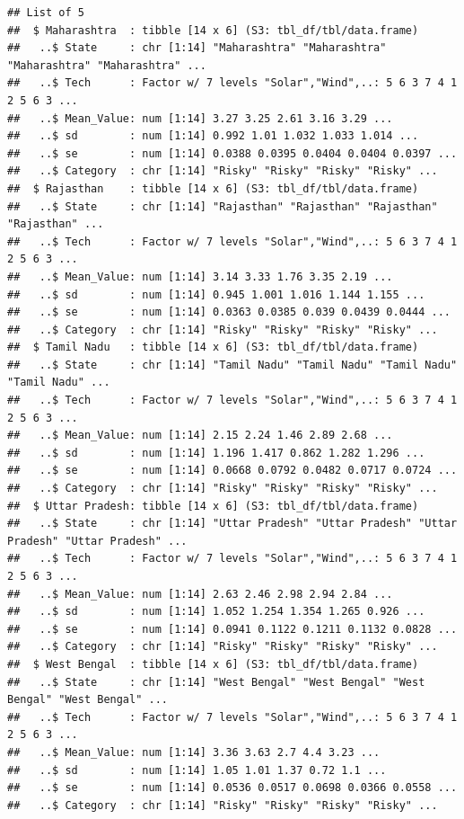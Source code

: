\documentclass[
]{article}
\begin{document}
\begin{verbatim}
## List of 5
##  $ Maharashtra  : tibble [14 x 6] (S3: tbl_df/tbl/data.frame)
##   ..$ State     : chr [1:14] "Maharashtra" "Maharashtra" "Maharashtra" "Maharashtra" ...
##   ..$ Tech      : Factor w/ 7 levels "Solar","Wind",..: 5 6 3 7 4 1 2 5 6 3 ...
##   ..$ Mean_Value: num [1:14] 3.27 3.25 2.61 3.16 3.29 ...
##   ..$ sd        : num [1:14] 0.992 1.01 1.032 1.033 1.014 ...
##   ..$ se        : num [1:14] 0.0388 0.0395 0.0404 0.0404 0.0397 ...
##   ..$ Category  : chr [1:14] "Risky" "Risky" "Risky" "Risky" ...
##  $ Rajasthan    : tibble [14 x 6] (S3: tbl_df/tbl/data.frame)
##   ..$ State     : chr [1:14] "Rajasthan" "Rajasthan" "Rajasthan" "Rajasthan" ...
##   ..$ Tech      : Factor w/ 7 levels "Solar","Wind",..: 5 6 3 7 4 1 2 5 6 3 ...
##   ..$ Mean_Value: num [1:14] 3.14 3.33 1.76 3.35 2.19 ...
##   ..$ sd        : num [1:14] 0.945 1.001 1.016 1.144 1.155 ...
##   ..$ se        : num [1:14] 0.0363 0.0385 0.039 0.0439 0.0444 ...
##   ..$ Category  : chr [1:14] "Risky" "Risky" "Risky" "Risky" ...
##  $ Tamil Nadu   : tibble [14 x 6] (S3: tbl_df/tbl/data.frame)
##   ..$ State     : chr [1:14] "Tamil Nadu" "Tamil Nadu" "Tamil Nadu" "Tamil Nadu" ...
##   ..$ Tech      : Factor w/ 7 levels "Solar","Wind",..: 5 6 3 7 4 1 2 5 6 3 ...
##   ..$ Mean_Value: num [1:14] 2.15 2.24 1.46 2.89 2.68 ...
##   ..$ sd        : num [1:14] 1.196 1.417 0.862 1.282 1.296 ...
##   ..$ se        : num [1:14] 0.0668 0.0792 0.0482 0.0717 0.0724 ...
##   ..$ Category  : chr [1:14] "Risky" "Risky" "Risky" "Risky" ...
##  $ Uttar Pradesh: tibble [14 x 6] (S3: tbl_df/tbl/data.frame)
##   ..$ State     : chr [1:14] "Uttar Pradesh" "Uttar Pradesh" "Uttar Pradesh" "Uttar Pradesh" ...
##   ..$ Tech      : Factor w/ 7 levels "Solar","Wind",..: 5 6 3 7 4 1 2 5 6 3 ...
##   ..$ Mean_Value: num [1:14] 2.63 2.46 2.98 2.94 2.84 ...
##   ..$ sd        : num [1:14] 1.052 1.254 1.354 1.265 0.926 ...
##   ..$ se        : num [1:14] 0.0941 0.1122 0.1211 0.1132 0.0828 ...
##   ..$ Category  : chr [1:14] "Risky" "Risky" "Risky" "Risky" ...
##  $ West Bengal  : tibble [14 x 6] (S3: tbl_df/tbl/data.frame)
##   ..$ State     : chr [1:14] "West Bengal" "West Bengal" "West Bengal" "West Bengal" ...
##   ..$ Tech      : Factor w/ 7 levels "Solar","Wind",..: 5 6 3 7 4 1 2 5 6 3 ...
##   ..$ Mean_Value: num [1:14] 3.36 3.63 2.7 4.4 3.23 ...
##   ..$ sd        : num [1:14] 1.05 1.01 1.37 0.72 1.1 ...
##   ..$ se        : num [1:14] 0.0536 0.0517 0.0698 0.0366 0.0558 ...
##   ..$ Category  : chr [1:14] "Risky" "Risky" "Risky" "Risky" ...
\end{verbatim}
\end{document}
